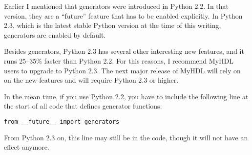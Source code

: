 \begin{notice}[warning]
Earlier I mentioned that generators were
introduced in Python 2.2. In that version, they are a ``future''
feature that has to be enabled explicitly. In Python 2.3, which is the
latest stable Python version at the time of this writing, generators
are enabled by default.

Besides generators, Python 2.3 has several other interesting new
features, and it runs 25--35\% faster than Python 2.2. For this
reasons, I recommend MyHDL users to upgrade to Python 2.3. The next
major release of MyHDL will rely on on the new features and will
require Python 2.3 or higher.

In the mean time, if you use Python 2.2, you have to include the
following line at the start of all code that defines generator
functions:

\begin{verbatim}
from __future__ import generators
\end{verbatim}

From Python 2.3 on, this line may still be in the code, though it will
not have an effect anymore.
\end{notice}

